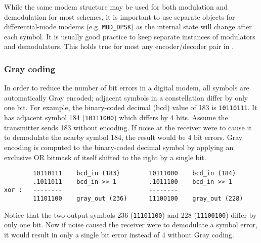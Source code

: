 While the same modem structure may be used for both modulation and
demodulation for most schemes, it is important to use separate objects
for differential-mode modems (e.g. {\tt MOD\_DPSK}) as the internal state
will change after each symbol.
It is usually good practice to keep separate instances of modulators and
demodulators.
This holds true for most any encoder/decoder pair in \liquid.

\subsubsection{Gray coding}
In order to reduce the number of bit errors in a digital modem,
all symbols are automatically Gray encoded;
adjacent symbols in a constellation differ by only one bit.
%
For example, the binary-coded decimal (bcd) value of 183 is {\tt 10110111}.
It has adjacent symbol 184 ({\tt 10111000}) which differs by 4 bits.
Assume the transmitter sends 183 without encoding.
If noise at the receiver were to cause it to demodulate the nearby symbol 184,
the result would be 4 bit errors.
%
Gray encoding is computed to the binary-coded decimal symbol
by applying an exclusive OR bitmask of itself shifted to the right by a
single bit.
\begin{verbatim}
        10110111    bcd_in (183)        10111000    bcd_in (184)
        .1011011    bcd_in >> 1         .1011100    bcd_in >> 1
xor :   --------                        --------
        11101100    gray_out (236)      11100100    gray_out (228)
\end{verbatim}
Notice that the two output symbols
236 ({\tt 11101100}) and
228 ({\tt 11100100}) differ by only one bit.
Now if noise caused the receiver were to demodulate a symbol error, it would
result in only a single bit error instead of 4 without Gray coding.

